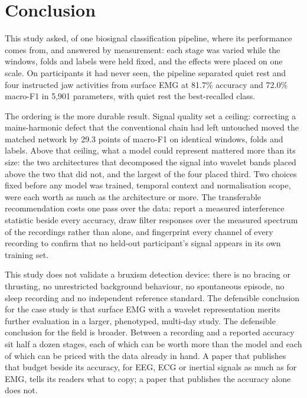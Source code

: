 \documentclass[pdflatex,sn-nature,iicol]{sn-jnl}
\begin{document}
\section{Conclusion}

This study asked, of one biosignal classification pipeline, where its performance comes from, and answered by measurement: each stage was varied while the windows, folds and labels were held fixed, and the effects were placed on one scale. On participants it had never seen, the pipeline separated quiet rest and four instructed jaw activities from surface EMG at 81.7\% accuracy and 72.0\% macro-F1 in 5,901 parameters, with quiet rest the best-recalled class.

The ordering is the more durable result. Signal quality set a ceiling: correcting a mains-harmonic defect that the conventional chain had left untouched moved the matched network by 29.3 points of macro-F1 on identical windows, folds and labels. Above that ceiling, what a model could represent mattered more than its size: the two architectures that decomposed the signal into wavelet bands placed above the two that did not, and the largest of the four placed third. Two choices fixed before any model was trained, temporal context and normalisation scope, were each worth as much as the architecture or more. The transferable recommendation costs one pass over the data: report a measured interference statistic beside every accuracy, draw filter responses over the measured spectrum of the recordings rather than alone, and fingerprint every channel of every recording to confirm that no held-out participant's signal appears in its own training set.

This study does not validate a bruxism detection device: there is no bracing or thrusting, no unrestricted background behaviour, no spontaneous episode, no sleep recording and no independent reference standard. The defensible conclusion for the case study is that surface EMG with a wavelet representation merits further evaluation in a larger, phenotyped, multi-day study. The defensible conclusion for the field is broader. Between a recording and a reported accuracy sit half a dozen stages, each of which can be worth more than the model and each of which can be priced with the data already in hand. A paper that publishes that budget beside its accuracy, for EEG, ECG or inertial signals as much as for EMG, tells its readers what to copy; a paper that publishes the accuracy alone does not.

\backmatter
\end{document}
